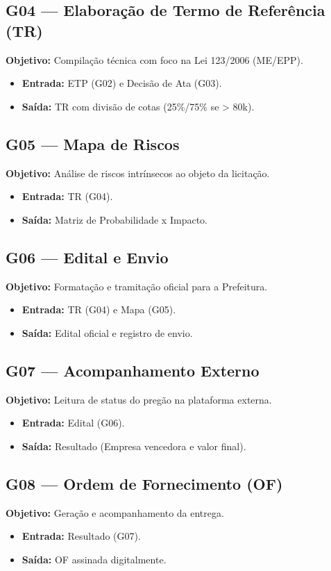 \documentclass[a4paper,11pt]{article}
\begin{document}
\subsection{G04 --- Elaboração de Termo de Referência (TR)}
\textbf{Objetivo:} Compilação técnica com foco na Lei 123/2006 (ME/EPP).
\begin{itemize}
    \item \textbf{Entrada:} ETP (G02) e Decisão de Ata (G03).
    \item \textbf{Saída:} TR com divisão de cotas (25\%/75\% se > 80k).
\end{itemize}

\subsection{G05 --- Mapa de Riscos}
\textbf{Objetivo:} Análise de riscos intrínsecos ao objeto da licitação.
\begin{itemize}
    \item \textbf{Entrada:} TR (G04).
    \item \textbf{Saída:} Matriz de Probabilidade x Impacto.
\end{itemize}

\subsection{G06 --- Edital e Envio}
\textbf{Objetivo:} Formatação e tramitação oficial para a Prefeitura.
\begin{itemize}
    \item \textbf{Entrada:} TR (G04) e Mapa (G05).
    \item \textbf{Saída:} Edital oficial e registro de envio.
\end{itemize}

\subsection{G07 --- Acompanhamento Externo}
\textbf{Objetivo:} Leitura de status do pregão na plataforma externa.
\begin{itemize}
    \item \textbf{Entrada:} Edital (G06).
    \item \textbf{Saída:} Resultado (Empresa vencedora e valor final).
\end{itemize}

\subsection{G08 --- Ordem de Fornecimento (OF)}
\textbf{Objetivo:} Geração e acompanhamento da entrega.
\begin{itemize}
    \item \textbf{Entrada:} Resultado (G07).
    \item \textbf{Saída:} OF assinada digitalmente.
\end{itemize}
\end{document}
